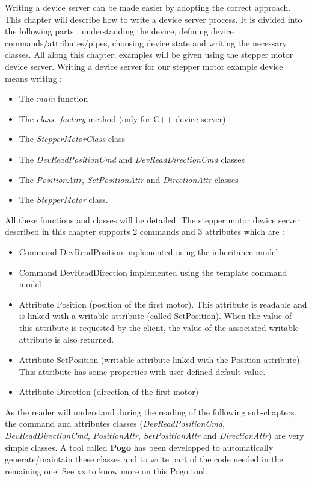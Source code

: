 Writing a device server can be made easier by adopting the correct
approach. This chapter will describe how to write a device server
process. It is divided into the following parts : understanding the
device, defining device commands/attributes/pipes, choosing device
state and writing the necessary classes. All along this chapter, examples
will be given using the stepper motor device server. Writing a device
server for our stepper motor example device means writing :
\begin{itemize}
\item The \emph{main} function
\item The \emph{class\_factory} method (only for C++ device server)
\item The \emph{StepperMotorClass} class
\item The \emph{DevReadPositionCmd} and \emph{DevReadDirectionCmd} classes
\item The \emph{PositionAttr}, \emph{SetPositionAttr} and \emph{DirectionAttr}
classes
\item The \emph{StepperMotor} class. 
\end{itemize}
All these functions and classes will be detailed. The stepper motor
device server described in this chapter supports 2 commands and 3
attributes which are :
\begin{itemize}
\item Command DevReadPosition implemented using the inheritance
model
\item Command DevReadDirection implemented using the template
command model
\item Attribute Position (position of the first motor). This attribute
is readable and is linked with a writable attribute (called SetPosition).
When the value of this attribute is requested by the client, the value
of the associated writable attribute is also returned.
\item Attribute SetPosition (writable attribute linked with the Position
attribute). This attribute has some properties with user defined default
value.
\item Attribute Direction (direction of the first motor)
\end{itemize}
As the reader will understand during the reading of the following
sub-chapters, the command and attributes classes (\emph{DevReadPositionCmd},
\emph{DevReadDirectionCmd}, \emph{PositionAttr}, \emph{SetPositionAttr}
and \emph{DirectionAttr}) are very simple classes. A tool called \textbf{Pogo}
has been developped to automatically generate/maintain these classes
and to write part of the code needed in the remaining one. See xx
to know more on this Pogo tool.


